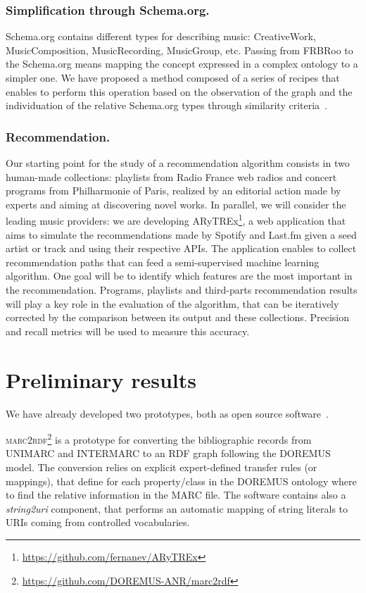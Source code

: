 \documentclass{llncs}
\begin{document}
\subsubsection*{Simplification through Schema.org.}
Schema.org contains different types for describing music: CreativeWork, MusicComposition, MusicRecording, MusicGroup, etc. Passing from FRBRoo to the Schema.org means mapping the concept expressed in a complex ontology to a simpler one. We have proposed a method composed of a series of recipes that enables to perform this operation based on the observation of the graph and the individuation of the relative Schema.org types through similarity criteria~\cite{lisena2016mapping}.

\subsubsection*{Recommendation.}
Our starting point for the study of a recommendation algorithm consists in two human-made collections: playlists from Radio France web radios and concert programs from Philharmonie of Paris, realized by an editorial action made by experts and aiming at discovering novel works. In parallel, we will consider the leading music providers: we are developing ARyTREx\footnote{\url{https://github.com/fernanev/ARyTREx}}, a web application that aims to simulate the recommendations made by Spotify and Last.fm given a seed artist or track and using their respective APIs. The application enables to collect recommendation paths that can feed a semi-supervised machine learning algorithm. One goal will be to identify which features are the most important in the recommendation. Programs, playlists and third-parts recommendation results will play a key role in the evaluation of the algorithm, that can be iteratively corrected by the comparison between its output and these collections. Precision and recall metrics will be used to measure this accuracy.


\section{Preliminary results}
\label{sec:results}
We have already developed two prototypes, both as open source software~\cite{lisena2016exploring}.

\textsc{marc2rdf}\footnote{\url{https://github.com/DOREMUS-ANR/marc2rdf}} is a prototype for converting the bibliographic records from UNIMARC and INTERMARC to an RDF graph following the DOREMUS model. The conversion relies on explicit expert-defined transfer rules (or mappings), that define for each property/class in the DOREMUS ontology where to find the relative information in the MARC file. The software contains also a \textit{string2uri} component, that performs an automatic mapping of string literals to URIs coming from controlled vocabularies.
\end{document}
